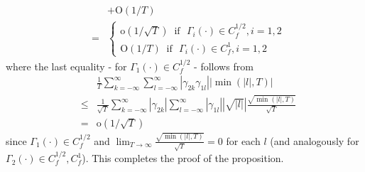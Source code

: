 \documentclass[11pt]{article}
\begin{document}
\begin{appendix}
\begin{eqnarray*}
&&+\textrm{O}(1/T) \\
&=&\left\{\begin{array}{cc}\textrm{o}(1/\sqrt{T})~\textrm{~if~~}\Gamma_i(\cdot)\in
C_f^{1/2}, i=1,2\\\textrm{O}(1/T)~\textrm{~if~~}\Gamma_i(\cdot)\in
C_f^{1}, i=1,2\end{array}\right.
\end{eqnarray*}
where the last equality - for $\Gamma_1(\cdot)\in C_f^{1/2}$ -
follows from
\begin{eqnarray*}
 &&\frac{1}{T}\sum_{k=-\infty}^\infty \sum_{l=-\infty}^\infty |\gamma_{2k}\gamma_{1l}||\min(|l|,T)|\\
 &\leq&
 \frac{1}{\sqrt{T}}\sum_{k=-\infty}^\infty |\gamma_{2k}|\sum_{l=-\infty}^\infty  |\gamma_{1l}||\sqrt{|l|}|\frac{\sqrt{\min(|l|,T)}}{\sqrt{T}}\\
&=&\textrm{o}(1/\sqrt{T})
\end{eqnarray*}
since $\Gamma_1(\cdot)\in C_f^{1/2}$ and
$\displaystyle{\lim_{T\to\infty}\frac{\sqrt{\min(|l|,T)}}{\sqrt{T}}}=0$
for each $l$ (and analogously for $\Gamma_2(\cdot)\in
C_f^{1/2},C_f^1$). This completes the proof of the proposition. \\


\end{appendix}
\end{document}
